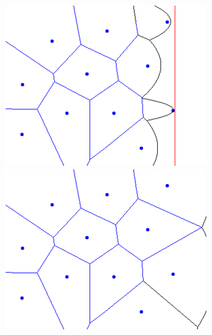 \begin{figure}[H]
    \begin{center}
        \begin{minipage}[h]{0.3\linewidth}
            \includegraphics[width=1\linewidth]{fortunes-algo-19.jpg}
        \end{minipage}
        \hfill
        \begin{minipage}[h]{0.3\linewidth}
            \includegraphics[width=1\linewidth]{fortunes-algo-20.jpg}
        \end{minipage}
        \hfill
        \begin{minipage}[h]{0.3\linewidth}

\end{minipage}
\end{center}
\end{figure}
